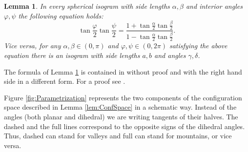 \documentclass{amsart}
\newtheorem{lem}[thm]{Lemma}
\theoremstyle{definition}
\renewcommand{\phi}{\varphi}
\begin{document}
\begin{lem}
\label{lem:Napier}
In every spherical isogram with side lengths $\alpha, \beta$ and interior angles $\phi, \psi$ the following equation holds:
\begin{equation}
\label{eqn:Napier}
\tan\frac{\phi}2 \tan\frac{\psi}2 =
\frac{1 + \tan\frac{\alpha}{2}\tan\frac{\beta}{2}}{1 - \tan\frac{\alpha}{2}\tan\frac{\beta}{2}}.
\end{equation}
Vice versa, for any $\alpha, \beta \in (0,\pi)$ and $\phi, \psi \in (0,2\pi)$ satisfying the above equation there is an isogram with side lengths $a,b$ and angles $\gamma, \delta$.
\end{lem}
The formula of Lemma \ref{lem:Napier} is contained in \cite[\S 22]{GrafSauer1931} without proof and with the right hand side in a different form.
For a proof see \cite[Theorem 3.19 and Remark 3.20]{Izmestiev2026}.

Figure \ref{fig:Parametrization} represents the two components of the configuration space described in Lemma \ref{lem:ConfSpace} in a schematic way.
Instead of the angles (both planar and dihedral) we are writing tangents of their halves.
The dashed and the full lines correspond to the opposite signs of the dihedral angles.
Thus, dashed can stand for valleys and full can stand for mountains, or vice versa.
\end{document}
